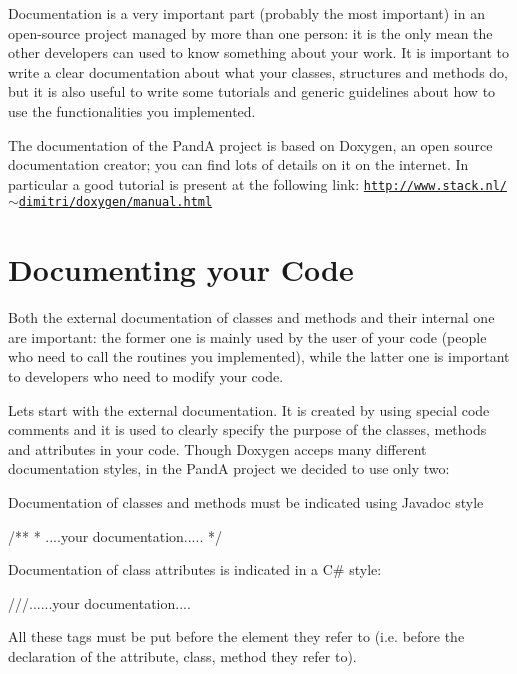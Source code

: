 Documentation is a very important part (probably the most important) in an open-\/source project managed by more than one person\+: it is the only mean the other developers can used to know something about your work. It is important to write a clear documentation about what your classes, structures and methods do, but it is also useful to write some tutorials and generic guidelines about how to use the functionalities you implemented.

The documentation of the PandA project is based on Doxygen, an open source documentation creator; you can find lots of details on it on the internet. In particular a good tutorial is present at the following link\+: \href{http://www.stack.nl/~dimitri/doxygen/manual.html}{\tt http\+://www.\+stack.\+nl/$\sim$dimitri/doxygen/manual.\+html}\hypertarget{documentation_how_to_doc_code_how_to}{}\section{Documenting your Code}\label{documentation_how_to_doc_code_how_to}
Both the external documentation of classes and methods and their internal one are important\+: the former one is mainly used by the user of your code (people who need to call the routines you implemented), while the latter one is important to developers who need to modify your code.

Let\textquotesingle{}s start with the external documentation. It is created by using special code comments and it is used to clearly specify the purpose of the classes, methods and attributes in your code. Though Doxygen acceps many different documentation styles, in the PandA project we decided to use only two\+:
\begin{DoxyEnumerate}
\item Documentation of classes and methods must be indicated using Javadoc style \begin{DoxyVerb}/**
 * ....your documentation.....
 */
\end{DoxyVerb}

\item Documentation of class attributes is indicated in a C\# style\+: \begin{DoxyVerb}///......your documentation....
\end{DoxyVerb}
 All these tags must be put before the element they refer to (i.\+e. before the declaration of the attribute, class, method they refer to).
\end{DoxyEnumerate}

